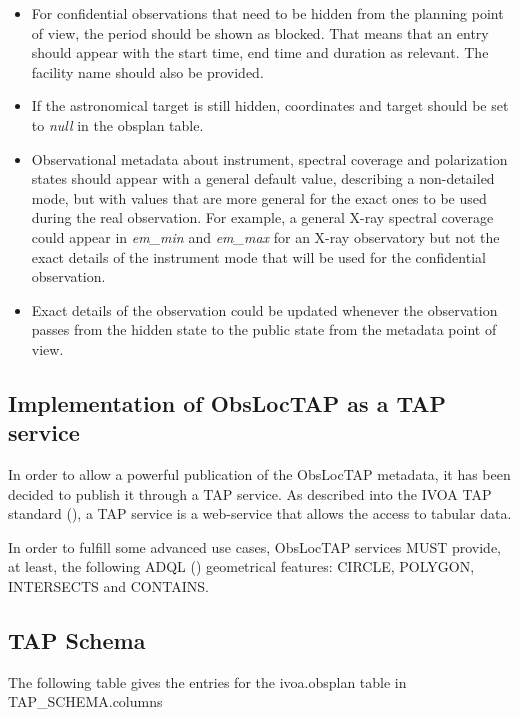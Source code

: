 \documentclass[11pt,a4paper]{ivoa}
\begin{document}
\begin{itemize}
	\item For confidential observations that need to be hidden from the planning point of view, the period should be shown as blocked. That means that an entry should appear with the start time, end time and duration as relevant. The facility name should also be provided.

	\item If the astronomical target is still hidden, coordinates and target should be set to \textit{null} in the obsplan table.

	\item Observational metadata about instrument, spectral coverage and polarization states should appear with a general default value, describing a non-detailed mode, but with values that are more general for the exact ones to be used during the real observation. For example, a general X-ray spectral coverage could appear in \textit{em\_min} and \textit{em\_max} for an X-ray observatory but not the exact details of the instrument mode that will be used for the confidential observation.

	\item Exact details of the observation could be updated whenever the observation passes from the hidden state to the public state from the metadata point of view.
\end{itemize}

\subsection{Implementation of ObsLocTAP as a TAP service}
In order to allow a powerful publication of the ObsLocTAP metadata, it has been decided to 
publish it through a TAP service. As described into the IVOA TAP standard (\cite{Pat10}), 
a TAP service is a web-service that allows the access to tabular data.\par

In order to fulfill some advanced use cases, ObsLocTAP services MUST provide, at least, the 
following ADQL (\cite{Ina08}) geometrical features: CIRCLE, POLYGON, INTERSECTS and 
CONTAINS.\par

\subsection{TAP Schema}
The following table gives the entries for the ivoa.obsplan table in TAP\_SCHEMA.columns
\end{document}
